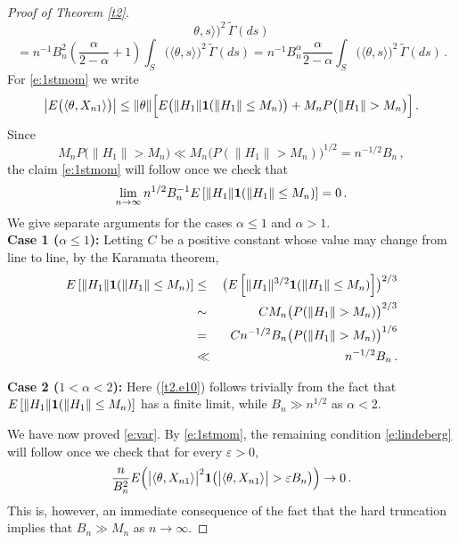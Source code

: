 \documentclass[11pt]{amsart}
\numberwithin{equation}{section}
\begin{document}
\begin{proof}[Proof of Theorem \ref{t2}]
$$  \theta,s\rangle\bigr)^2\, \tilde\Gamma(ds)
$$
$$
= n^{-1}B_n^{2} \left( \frac\alpha{2-\alpha}+1\right)
\int_S\bigl(\langle
  \theta,s\rangle\bigr)^2\, \tilde\Gamma(ds)
= n^{-1}B_n^{\alpha}\frac\alpha{2-\alpha} \int_S\bigl(\langle
  \theta,s\rangle\bigr)^2\, \tilde\Gamma(ds)\,.
$$
For \eqref{e:1stmom} we write
$$
\bigl|E\bigl(\langle \theta,X_{n1}\rangle\bigr)\bigr|
\leq \|\theta\| \Bigl[ E\bigl( \| H_1\|{{\bf 1}}( \| H_1\|\leq M_n)\bigr)
+ M_nP\bigl( \| H_1\|>M_n\bigr)\Bigr]\,.
$$
Since
$$
M_nP\bigl( \| H_1\|>M_n\bigr) \ll M_n\bigl( P( \|
H_1\|>M_n)\bigr)^{1/2}
= n^{-1/2}B_n\,,
$$
the claim \eqref{e:1stmom} will follow once we check that
\begin{equation}\label{t2.e10}
\lim_{n\rightarrow\infty}n^{1/2}B_n^{-1}E\left[\|H_1\|{{\bf 1}}(\|H_1\|\le
    M_n)\right]=0 \,.
\end{equation}
We give separate arguments for the cases $\alpha\le 1$ and $\alpha>1$.\\
{\bf Case 1 ($\alpha\le1$):} Letting $C$ be a positive
constant whose value may change from line to line, by the Karamata
theorem,
\begin{eqnarray*}
E\left[\|H_1\|{{\bf 1}}(\|H_1\|\le M_n)\right]
&\le&\bigl( E\left[\|H_1\|^{3/2}{{\bf 1}}(\|H_1\|\le M_n)\right]\bigr)^{2/3}\\
&\sim&CM_n\bigl( P(\|H_1\|>M_n)\bigr)^{2/3}\\
&=&Cn^{-1/2}B_n\bigl( P(\|H_1\|>M_n)\bigr)^{1/6}\\
&\ll&n^{-1/2}B_n\,.
\end{eqnarray*}

{\bf Case 2 ($1<\alpha<2$):} Here (\ref{t2.e10}) follows trivially
from the fact that $E\left[\|H_1\|{{\bf 1}}(\|H_1\|\le
    M_n)\right]$ has a finite limit, while
$B_n\gg n^{1/2}$ as $\alpha<2$.

We have now proved \eqref{e:var}. By \eqref{e:1stmom},
the remaining condition \eqref{e:lindeberg} will follow once we check
that for every ${\varepsilon}>0$,
$$
\frac{n}{B_n^2}E\Bigl( \bigl| \langle
\theta,X_{n1}\rangle \bigr|^2 {{\bf 1}}\bigl( \bigl|
\langle\theta,X_{n1}\rangle\bigr| >{\varepsilon} B_n\bigr)\Bigr)\to 0\,.
$$
This is, however, an immediate consequence of the fact that the hard
truncation implies that $B_n\gg M_n$ as $n\to\infty$.
\end{proof}
\end{document}
